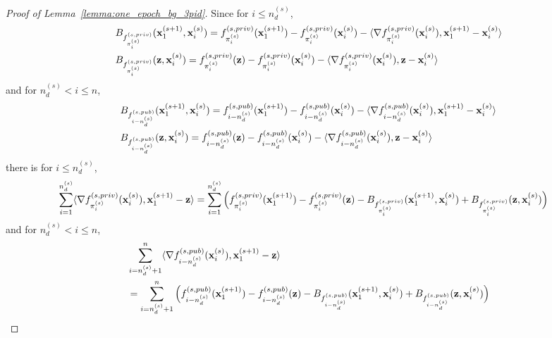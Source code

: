 \begin{proof}[Proof of Lemma~\ref{lemma:one_epoch_bg_3pid}]
    Since for $i \leq n_d^{(s)}$,
    \begin{align*}
        &B_{f_{\pi_i^{(s)}}^{(s, priv)}}({\mathbf{x}}_1^{(s+1)}, {\mathbf{x}}_i^{(s)}) 
        = f_{\pi_i^{(s)}}^{(s, priv)}({\mathbf{x}}_1^{(s+1)}) - f_{\pi_i^{(s)}}^{(s, priv)}({\mathbf{x}}_i^{(s)}) - \langle \nabla f_{\pi_i^{(s)}}^{(s, priv)}({\mathbf{x}}_i^{(s)}), {\mathbf{x}}_1^{(s+1)} - {\mathbf{x}}_i^{(s)}\rangle\\
        &B_{f_{\pi_i^{(s)}}^{(s, priv)}}({\mathbf{z}}, {\mathbf{x}}_i^{(s)}) 
        = f_{\pi_i^{(s)}}^{(s, priv)}({\mathbf{z}}) - f_{\pi_i^{(s)}}^{(s, priv)}({\mathbf{x}}_i^{(s)}) - \langle \nabla f_{\pi_i^{(s)}}^{(s, priv)}({\mathbf{x}}_i^{(s)}), {\mathbf{z}} - {\mathbf{x}}_i^{(s)}\rangle
    \end{align*}
    and for $n_d^{(s)} < i \leq n$,
    \begin{align*}
        &B_{f_{i-n_d^{(s)}}^{(s, pub)}}({\mathbf{x}}_1^{(s+1)}, {\mathbf{x}}_i^{(s)})
        = f_{i-n_d^{(s)}}^{(s, pub)}({\mathbf{x}}_1^{(s+1)}) 
        - f_{i-n_d^{(s)}}^{(s, pub)}({\mathbf{x}}_i^{(s)})
        - \langle \nabla f_{i-n_d^{(s)}}^{(s, pub)}({\mathbf{x}}_i^{(s)}), {\mathbf{x}}_1^{(s+1)} - {\mathbf{x}}_i^{(s)}\rangle\\
        &B_{f_{i-n_d^{(s)}}^{(s, pub)}}({\mathbf{z}}, {\mathbf{x}}_i^{(s)}) = f_{i-n_d^{(s)}}^{(s, pub)}({\mathbf{z}}) - f_{i-n_d^{(s)}}^{(s, pub)}({\mathbf{x}}_i^{(s)})
        - \langle \nabla f_{i-n_d^{(s)}}^{(s, pub)}({\mathbf{x}}_i^{(s)}),
        {\mathbf{z}} - {\mathbf{x}}_i^{(s)} \rangle
    \end{align*}
    there is for $i \leq n_d^{(s)}$,
    \begin{align}
    \label{eq:dot_to_bregmandiv_priv}
        \sum_{i=1}^{n_d^{(s)}}\langle \nabla f_{\pi_i^{(s)}}^{(s, priv)}({\mathbf{x}}_i^{(s)}), {\mathbf{x}}_1^{(s+1)} - {\mathbf{z}}\rangle 
        &= \sum_{i=1}^{n_d^{(s)}}\Big(f_{\pi_i^{(s)}}^{(s, priv)}({\mathbf{x}}_1^{(s+1)}) - f_{\pi_i^{(s)}}^{(s, priv)}({\mathbf{z}}) - B_{f_{\pi_i^{(s)}}^{(s, priv)}}({\mathbf{x}}_1^{(s+1)}, {\mathbf{x}}_i^{(s)}) + B_{f_{\pi_i^{(s)}}^{(s, priv)}}({\mathbf{z}}, {\mathbf{x}}_i^{(s)}) \Big)
    \end{align}
    and for $n_d^{(s)} < i \leq n$,
    \begin{align}
    \label{eq:dot_to_bregmandiv_pub}
        &\sum_{i=n_d^{(s)}+1}^{n}\langle \nabla f_{i-n_d^{(s)}}^{(s, pub)}({\mathbf{x}}_i^{(s)}), 
        {\mathbf{x}}_1^{(s+1)} - {\mathbf{z}}\rangle\\
    \nonumber
        &= \sum_{i=n_d^{(s)}+1}^{n}\Big(
            f_{i-n_d^{(s)}}^{(s, pub)}({\mathbf{x}}_1^{(s+1)})
            - f_{i-n_d^{(s)}}^{(s, pub)}({\mathbf{z}})
            - B_{f_{i-n_d^{(s)}}^{(s, pub)}}({\mathbf{x}}_1^{(s+1)}, {\mathbf{x}}_i^{(s)})
            + B_{f_{i-n_d^{(s)}}^{(s, pub)}}({\mathbf{z}}, {\mathbf{x}}_i^{(s)})
        \Big)
    \end{align}

\end{proof}
